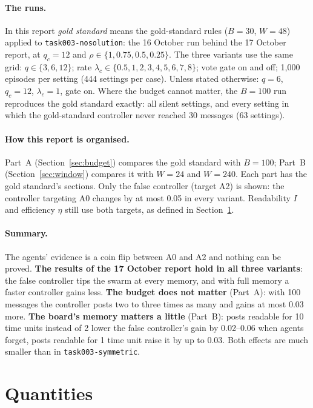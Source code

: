 \documentclass[10pt,a4paper]{article}
\begin{document}
\paragraph{The runs.} In this report \emph{gold standard} means the gold-standard rules ($B = 30$, $W = 48$) applied to
\texttt{task003-nosolution}: the 16 October run behind the 17 October report, at $q_c = 12$ and
$\rho \in \{1, 0.75, 0.5, 0.25\}$. The three variants use the same grid: $q \in \{3, 6, 12\}$; rate
$\lambda_c \in \{0.5, 1, 2, 3, 4, 5, 6, 7, 8\}$; vote gate on and off; 1{,}000 episodes per setting (444 settings per
case). Unless stated otherwise: $q = 6$, $q_c = 12$, $\lambda_c = 1$, gate on. Where the budget cannot matter, the
$B = 100$ run reproduces the gold standard exactly: all silent settings, and every setting in which the
gold-standard controller never reached 30 messages (63 settings).

\paragraph{How this report is organised.} Part~A (Section~\ref{sec:budget}) compares the gold standard with
$B = 100$; Part~B (Section~\ref{sec:window}) compares it with $W = 24$ and $W = 240$. Each part has the gold standard's
sections. Only the false controller (target A2) is shown: the controller targeting A0 changes by at most 0.05 in
every variant. Readability $I$ and efficiency $\eta$ still use both targets, as defined in Section~\ref{sec:quantities}.

\paragraph{Summary.} The agents' evidence is a coin flip between A0 and A2 and nothing can be proved. \textbf{The
results of the 17 October report hold in all three variants}: the false controller tips the swarm at every memory,
and with full memory a faster controller gains less. \textbf{The budget does not matter} (Part~A): with 100 messages
the controller posts two to three times as many and gains at most 0.03 more. \textbf{The board's memory matters a
little} (Part~B): posts readable for 10 time units instead of 2 lower the false controller's gain by 0.02--0.06 when
agents forget, posts readable for 1 time unit raise it by up to 0.03. Both effects are much smaller than in
\texttt{task003-symmetric}.

\section{Quantities}\label{sec:quantities}
\end{document}
